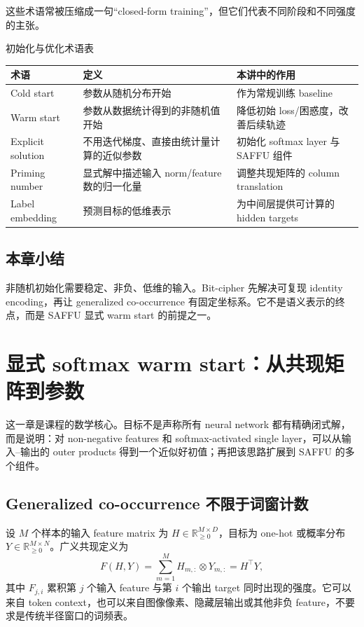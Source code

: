 \documentclass[a4paper]{article}
\begin{document}
这些术语常被压缩成一句“closed-form training”，但它们代表不同阶段和不同强度的主张。

\begin{knowledgebox}{初始化与优化术语表}
\begin{tabularx}{\textwidth}{L{0.18\textwidth} L{0.27\textwidth} X}
\toprule
术语 & 定义 & 本讲中的作用 \\
\midrule
Cold start & 参数从随机分布开始 & 作为常规训练 baseline \\
Warm start & 参数从数据统计得到的非随机值开始 & 降低初始 loss/困惑度，改善后续轨迹 \\
Explicit solution & 不用迭代梯度、直接由统计量计算的近似参数 & 初始化 softmax layer 与 SAFFU 组件 \\
Priming number & 显式解中描述输入 norm/feature 数的归一化量 & 调整共现矩阵的 column translation \\
Label embedding & 预测目标的低维表示 & 为中间层提供可计算的 hidden targets \\
\bottomrule
\end{tabularx}
\end{knowledgebox}

\subsection{本章小结}

非随机初始化需要稳定、非负、低维的输入。Bit-cipher 先解决可复现 identity encoding，再让 generalized co-occurrence 有固定坐标系。它不是语义表示的终点，而是 SAFFU 显式 warm start 的前提之一。

\section{显式 softmax warm start：从共现矩阵到参数}

这一章是课程的数学核心。目标不是声称所有 neural network 都有精确闭式解，而是说明：对 non-negative features 和 softmax-activated single layer，可以从输入--输出的 outer products 得到一个近似好初值；再把该思路扩展到 SAFFU 的多个组件。

\subsection{Generalized co-occurrence 不限于词窗计数}

设 $M$ 个样本的输入 feature matrix 为 $H\in\mathbb{R}_{\ge 0}^{M\times D}$，目标为 one-hot 或概率分布 $Y\in\mathbb{R}_{\ge 0}^{M\times N}$。广义共现定义为
\[
F(H,Y)=\sum_{m=1}^{M}H_{m,:}\otimes Y_{m,:}=H^\top Y,
\]
其中 $F_{j,i}$ 累积第 $j$ 个输入 feature 与第 $i$ 个输出 target 同时出现的强度。它可以来自 token context，也可以来自图像像素、隐藏层输出或其他非负 feature，不要求是传统半径窗口的词频表。
\end{document}
